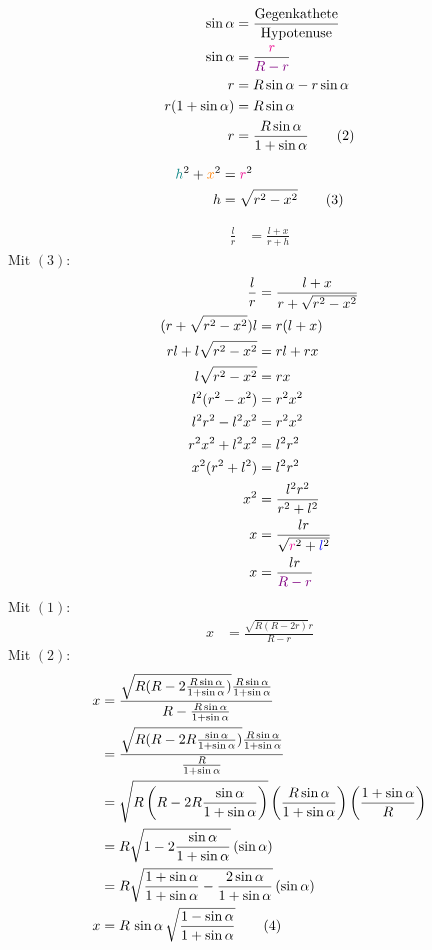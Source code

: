 \begin{align*}
	\sin\alpha &= \frac{\text{Gegenkathete}}{\text{Hypotenuse}} \\
	\sin\alpha &= \frac{ \textcolor{magenta}{r} }{ \textcolor{violet}{R-r} } \\
	r &= R\sin\alpha - r\sin\alpha \\
	r(1+\sin\alpha) &= R\sin\alpha \\
	r &= \frac{R\sin\alpha}{1+\sin\alpha} \tag{2}
\end{align*}

\begin{align*}
	\textcolor{teal}{h}^2 + \textcolor{orange}{x}^2 &= \textcolor{magenta}{r}^2 \\
	h &= \sqrt{r^2-x^2} \tag{3}
\end{align*}

\begin{samepage}
	\begin{align*}
		\frac{l}{r} &= \frac{l+x}{r+h}
	\end{align*}
	Mit $(3)$:
	\begin{align*}
		\frac{l}{r} &= \frac{l+x}{r+\sqrt{r^2-x^2}} \\
		(r+\sqrt{r^2-x^2})l &= r(l+x) \\
		rl + l\sqrt{r^2-x^2} &= rl+rx \\
		l\sqrt{r^2-x^2} &= rx \\
		l^2(r^2-x^2) &= r^2 x^2 \\
		l^2 r^2 - l^2 x^2 &= r^2 x^2 \\
		r^2 x^2 + l^2 x^2 &= l^2 r^2 \\
		x^2 (r^2+l^2) &= l^2 r^2 \\
		x^2 &= \frac{l^2 r^2}{r^2 + l^2} \\
		x &= \frac{lr}{\sqrt{\textcolor{magenta}{r}^2+\textcolor{blue}{l}^2}} \\
		x &= \frac{lr}{\textcolor{violet}{R-r}}
	\end{align*}
	Mit $(1)$:
	\begin{align*}
		x &= \frac{\sqrt{R(R-2r)}r}{R-r}
	\end{align*}
	Mit $(2)$:
	\begin{align*}
		x &= \frac{\sqrt{R(R-2\frac{R\sin\alpha}{1+\sin\alpha})}\frac{R\sin\alpha}{1+\sin\alpha}}{R-\frac{R\sin\alpha}{1+\sin\alpha}} \\
		&= \frac{\sqrt{R(R-2R\frac{\sin\alpha}{1+\sin\alpha})}\frac{R\sin\alpha}{1+\sin\alpha}}{\frac{R}{1+\sin\alpha}} \\
		&= \sqrt{R\left(R-2R\frac{\sin\alpha}{1+\sin\alpha}\right)}\left(\frac{R\sin\alpha}{1+\sin\alpha}\right)\left(\frac{1+\sin\alpha}{R}\right) \\
		&= R\sqrt{1-2\frac{\sin\alpha}{1+\sin\alpha}} \, (\sin\alpha) \\
		&= R\sqrt{\frac{1+\sin\alpha}{1+\sin\alpha}-\frac{2\sin\alpha}{1+\sin\alpha}} \, (\sin\alpha) \\
		x &= R \, \sin\alpha \, \sqrt{\frac{1-\sin\alpha}{1+\sin\alpha}} \tag{4}
	\end{align*}
\end{samepage}
